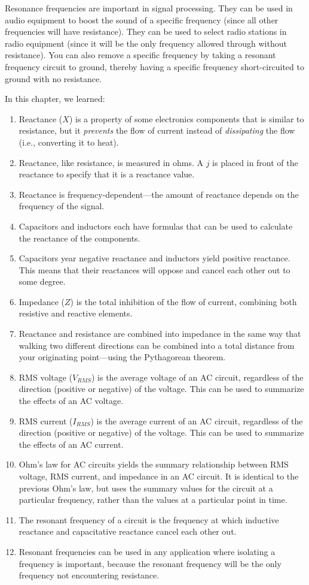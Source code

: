 Resonance frequencies are important in signal processing.
They can be used in audio equipment to boost the sound of a specific frequency (since all other frequencies will have resistance).
They can be used to select radio stations in radio equipment (since it will be the only frequency allowed through without resistance).
You can also remove a specific frequency by taking a resonant frequency circuit to ground, thereby having a specific frequency short-circuited to ground with no resistance.

\reviewsection

In this chapter, we learned:

\begin{enumerate}
\item Reactance ($X$) is a property of some electronics components that is similar to resistance, but it \emph{prevents} the flow of current instead of \emph{dissipating} the flow (i.e., converting it to heat).
\item Reactance, like resistance, is measured in ohms.  A $j$ is placed in front of the reactance to specify that it is a reactance value.
\item Reactance is frequency-dependent---the amount of reactance depends on the frequency of the signal.
\item Capacitors and inductors each have formulas that can be used to calculate the reactance of the components.  
\item Capacitors year negative reactance and inductors yield positive reactance.  This means that their reactances will oppose and cancel each other out to some degree.
\item Impedance ($Z$) is the total inhibition of the flow of current, combining both resistive and reactive elements.
\item Reactance and resistance are combined into impedance in the same way that walking two different directions can be combined into a total distance from your originating point---using the Pythagorean theorem.
\item RMS voltage ($V_{RMS}$) is the average voltage of an AC circuit, regardless of the direction (positive or negative) of the voltage.  This can be used to summarize the effects of an AC voltage.
\item RMS current ($I_{RMS}$) is the average current of an AC circuit, regardless of the direction (positive or negative) of the voltage.  This can be used to summarize the effects of an AC current.
\item Ohm's law for AC circuits yields the summary relationship between RMS voltage, RMS current, and impedance in an AC circuit.  It is identical to the previous Ohm's law, but uses the summary values for the circuit at a particular frequency, rather than the values at a particular point in time.
\item The resonant frequency of a circuit is the frequency at which inductive reactance and capacitative reactance cancel each other out.
\item Resonant frequencies can be used in any application where isolating a frequency is important, because the resonant frequency will be the only frequency not encountering resistance.
\end{enumerate}

\exercisesection


